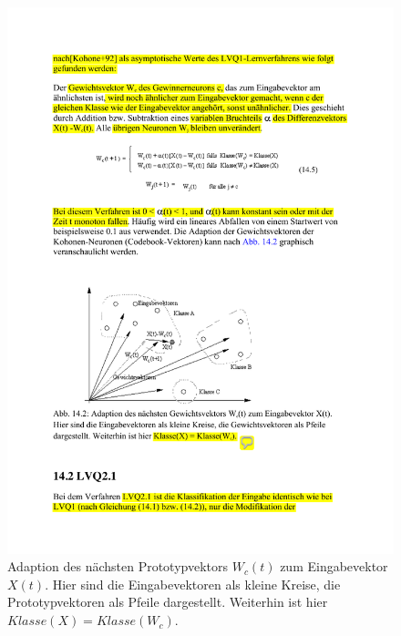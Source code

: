 \begin{figure}[ht!] \centering 
	\includegraphics[width=\linewidth]{figures/ch07_lvq1.pdf}
	\caption{Adaption des nächsten Prototypvektors $W_c(t)$ zum Eingabevektor $X(t)$. Hier sind die Eingabevektoren als kleine Kreise, die Prototypvektoren als Pfeile dargestellt. Weiterhin ist hier $Klasse(X) = Klasse(W_c)$.}
	\label{fig:ch07_lvq1}
\end{figure}



